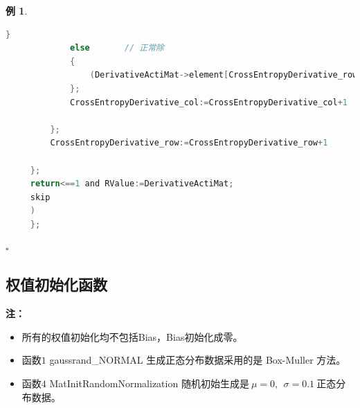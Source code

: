 \documentclass[UTF-8]{progbookcn}
\newtheorem{example}{例}[chapter]         %
\begin{document}
\begin{example}
\begin{lstlisting}[language=C,caption={函数 5 CrossEntropyDerivative}]
             }
             else       // 正常除
             {
                 (DerivativeActiMat->element[CrossEntropyDerivative_row])[CrossEntropyDerivative_col]:=-(One_hotMat.element[CrossEntropyDerivative_row])[CrossEntropyDerivative_col]/ (ActiMat->element[CrossEntropyDerivative_row])[CrossEntropyDerivative_col]
             };
             CrossEntropyDerivative_col:=CrossEntropyDerivative_col+1

         };
         CrossEntropyDerivative_row:=CrossEntropyDerivative_row+1

     };
     return<==1 and RValue:=DerivativeActiMat;
     skip
     )
     };
\end{lstlisting} \hfill$\square$
\end{example}



\subsection{权值初始化函数}
\begin{table}[!h]
\centering
\caption{激活函数相关函数}
\end{table}

\noindent\textbf{注：}
\begin{itemize}
  \item 所有的权值初始化均不包括Bias，Bias初始化成零。
  \item 函数$1$ gaussrand\_NORMAL 生成正态分布数据采用的是 Box-Muller 方法。
  \item 函数$4$ MatInitRandomNormalization 随机初始生成是$~\mu = 0, ~~\sigma = 0.1~$正态分布数据。
\end{itemize}
\end{document}
